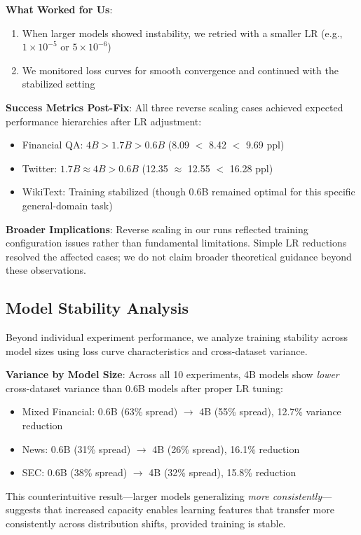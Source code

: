 \textbf{What Worked for Us}:
\begin{enumerate}
\item When larger models showed instability, we retried with a smaller LR (e.g., $1\times10^{-5}$ or $5\times10^{-6}$)
\item We monitored loss curves for smooth convergence and continued with the stabilized setting
\end{enumerate}

\textbf{Success Metrics Post-Fix}: All three reverse scaling cases achieved expected performance hierarchies after LR adjustment:
\begin{itemize}
\item Financial QA: $4B > 1.7B > 0.6B$ (8.09 $<$ 8.42 $<$ 9.69 ppl)
\item Twitter: $1.7B \approx 4B > 0.6B$ (12.35 $\approx$ 12.55 $<$ 16.28 ppl)
\item WikiText: Training stabilized (though 0.6B remained optimal for this specific general-domain task)
\end{itemize}

\textbf{Broader Implications}: Reverse scaling in our runs reflected training configuration issues rather than fundamental limitations. Simple LR reductions resolved the affected cases; we do not claim broader theoretical guidance beyond these observations.

\subsection{Model Stability Analysis}

Beyond individual experiment performance, we analyze training stability across model sizes using loss curve characteristics and cross-dataset variance.

\textbf{Variance by Model Size}: Across all 10 experiments, 4B models show \textit{lower} cross-dataset variance than 0.6B models after proper LR tuning:
\begin{itemize}
\item Mixed Financial: 0.6B (63\% spread) $\to$ 4B (55\% spread), 12.7\% variance reduction
\item News: 0.6B (31\% spread) $\to$ 4B (26\% spread), 16.1\% reduction
\item SEC: 0.6B (38\% spread) $\to$ 4B (32\% spread), 15.8\% reduction
\end{itemize}

This counterintuitive result---larger models generalizing \textit{more consistently}---suggests that increased capacity enables learning features that transfer more consistently across distribution shifts, provided training is stable.

